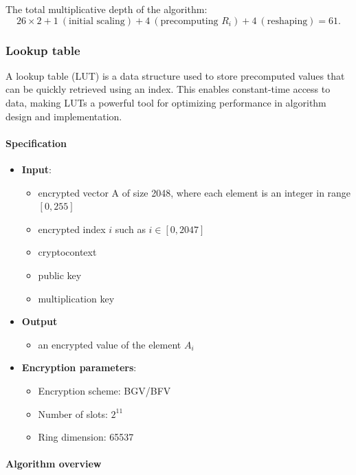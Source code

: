 \documentclass[article]{iacrtrans}
\begin{document}
The total multiplicative depth of the algorithm:
\[
26 \times 2 + 1\ (\text{initial scaling}) + 4\ (\text{precomputing } R_i) + 4\ (\text{reshaping}) = 61.
\]


\subsubsection{Lookup table}
A lookup table (LUT) is a data structure used to store precomputed values that can be quickly retrieved using an index. This enables constant-time access to data, making LUTs a powerful tool for optimizing performance in algorithm design and implementation.


\paragraph{Specification}
 \begin{itemize}
    \item \textbf{Input}: 
        \begin{itemize}
            \item encrypted vector A of size 2048, where each element is an integer in range $[0, 255]$
            \item encrypted index $i$ such as $i \in [0, 2047]$
            \item cryptocontext
            \item public key
            \item multiplication key
        \end{itemize}
    \item \textbf{Output}
        \begin{itemize}
            \item an encrypted value of the element  $A_i$
        \end{itemize}
    \item \textbf{Encryption parameters}:
        \begin{itemize}
            \item Encryption scheme: BGV/BFV
            \item Number of slots: $2^{11}$ 
            \item Ring dimension: 65537
        \end{itemize}
\end{itemize}
 

\paragraph{Algorithm overview}\mbox{}\\
\end{document}
